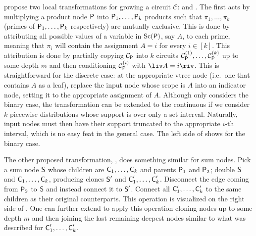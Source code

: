 \citeauthor{liang17} propose two local transformations for growing a circuit $\mathcal{C}$:
 and . The first acts by multiplying a product node $\operatorname{\textsf{P}}$ into
$\operatorname{\textsf{P}}_1,\ldots,\operatorname{\textsf{P}}_k$ products such that $\pi_1,\ldots,\pi_k$ (primes of $\operatorname{\textsf{P}}_1,\ldots,
\operatorname{\textsf{P}}_k$ respectively) are mutually exclusive. This is done by attributing all possible values of a
variable in $\operatorname*{\normalfont{Sc}}(\operatorname{\textsf{P}})$, say $A$, to each prime, meaning that $\pi_i$ will contain the assignment
$A=i$ for every $i\in\left[k\right]$. This attribution is done by partially copying
$\mathcal{C}_{\operatorname{\textsf{P}}}$ into $k$ circuits $\mathcal{C}_{\operatorname{\textsf{P}}}^{(1)},\ldots,\mathcal{C}_{\operatorname{\textsf{P}}}^{(k)}$
up to some depth $m$ and then conditioning $\mathcal{C}_{\operatorname{\textsf{P}}}^{(i)}$ with $\liv A=i\riv$. This is
straightforward for the discrete case: at the appropriate vtree node (i.e.\ one that contains $A$
as a leaf), replace the input node whose scope is $A$ into an indicator node, setting it to the
appropriate assignment of $A$. Although \citet{liang17} only considers the binary case, the
transformation can be extended to the continuous if we consider $k$ piecewise distributions whose
support is over only a set interval. Naturally, input nodes must then have their support truncated
to the appropriate $i$-th interval, which is no easy feat in the general case. The left side of
 shows  for the binary case.

The other proposed transformation, , does something similar for sum nodes. Pick a
sum node $\operatorname{\textsf{S}}$ whose children are $\operatorname{\textsf{C}}_1,\ldots,\operatorname{\textsf{C}}_k$ and parents $\operatorname{\textsf{P}}_1$ and $\operatorname{\textsf{P}}_2$;
double $\operatorname{\textsf{S}}$ and $\operatorname{\textsf{C}}_1,\ldots,\operatorname{\textsf{C}}_k$, producing clones $\operatorname{\textsf{S}}'$ and $\operatorname{\textsf{C}}_1',\ldots,
\operatorname{\textsf{C}}_k'$. Disconnect the edge coming from $\operatorname{\textsf{P}}_2$ to $\operatorname{\textsf{S}}$ and instead connect it to $\operatorname{\textsf{S}}'$.
Connect all $\operatorname{\textsf{C}}_1',\ldots,\operatorname{\textsf{C}}_k'$ to the same children as their original counterparts. This
operation is visualized on the right side of . One can further extend
 to apply this operation cloning nodes up to some depth $m$ and then joining the
last remaining deepest nodes similar to what was described for $\operatorname{\textsf{C}}_1',\ldots,\operatorname{\textsf{C}}_k'$.

